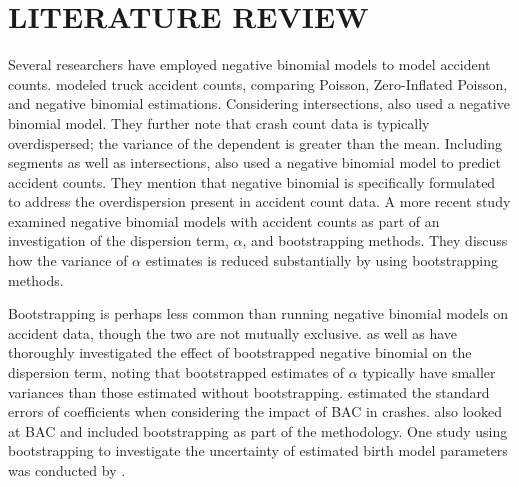 \documentclass[titlepage,12pt,times,nopageno]{article}
\begin{document}
\section*{\normalsize LITERATURE REVIEW}
Several researchers have employed negative binomial models to model accident counts.  \citet{miaou1993rbt} modeled truck accident counts, comparing Poisson, Zero-Inflated Poisson, and negative binomial estimations.  Considering intersections, \citet{poch1996nba} also used a negative binomial model.  They further note that crash count data is typically overdispersed; the variance of the dependent is greater than the mean.  Including segments as well as intersections, \citet{vogt1998amt} also used a negative binomial model to predict accident counts.  They mention that negative binomial is specifically formulated to address the overdispersion present in accident count data.  A more recent study \cite{zhang2007edp} examined negative binomial models with accident counts as part of an investigation of the dispersion term, $\alpha$, and bootstrapping methods.  They discuss how the variance of $\alpha$ estimates is reduced substantially by using bootstrapping methods.\par
Bootstrapping is perhaps less common than running negative binomial models on accident data, though the two are not mutually exclusive.  \citet{zhang2007edp} as well as \citet{lord2006mmv} have thoroughly investigated the effect of bootstrapped negative binomial on the dispersion term, noting that bootstrapped estimates of $\alpha$ typically have smaller variances than those estimated without bootstrapping.  \citet{keall2005mec} estimated the standard errors of coefficients when considering the impact of BAC in crashes.  \citet{heitjan1991mif} also looked at BAC and included bootstrapping as part of the methodology.  One study using bootstrapping to investigate the uncertainty of estimated birth model parameters was conducted by \citet{vadeby2004mrc}.  
\end{document}
